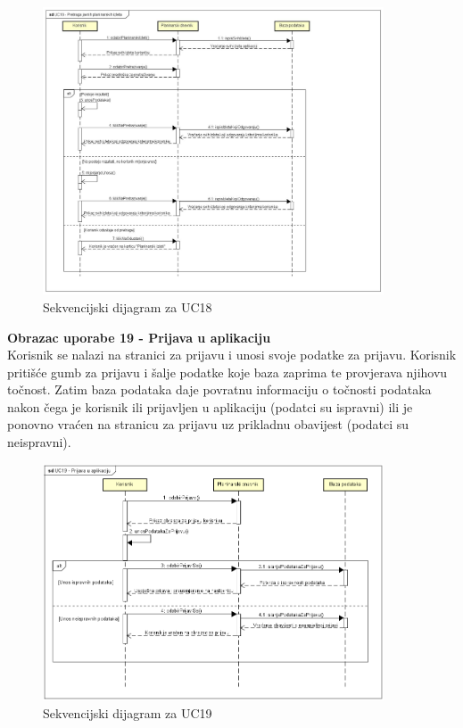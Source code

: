 				
				
				\begin{figure}[H]
					\centering
					\includegraphics[width=0.9\textwidth]{slike/UC18-Pretraga_javnih_izleta.jpg}
					\caption{Sekvencijski dijagram za UC18}
					\label{fig:mesh6}
				\end{figure}

\newpage
				
				\textbf{ Obrazac uporabe 19 - Prijava u aplikaciju}\\
				
Korisnik se nalazi na stranici za prijavu i unosi svoje podatke za prijavu. Korisnik pritišće gumb za prijavu i šalje podatke koje baza zaprima te provjerava njihovu točnost. Zatim baza podataka daje povratnu informaciju o točnosti podataka nakon čega je korisnik ili prijavljen u aplikaciju (podatci su ispravni) ili je ponovno vraćen na stranicu za prijavu uz prikladnu obavijest (podatci su neispravni).
				
				
				\begin{figure}[H]
					\centering
						\includegraphics[width=0.9\textwidth]{slike/UC19-Prijava_u_aplikaciju.png}
					\caption{Sekvencijski dijagram za UC19}
						\label{fig:mesh7}
				\end{figure}
				
